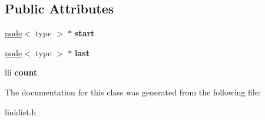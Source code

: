 \subsection*{Public Attributes}
\begin{DoxyCompactItemize}
\item 
\hyperlink{classnode}{node}$<$ type $>$ $\ast$ {\bfseries start}\hypertarget{classlinklist_ae04c2a3c47f24807d639771a0773dd43}{}\label{classlinklist_ae04c2a3c47f24807d639771a0773dd43}

\item 
\hyperlink{classnode}{node}$<$ type $>$ $\ast$ {\bfseries last}\hypertarget{classlinklist_a196ac8c76618fcdad92e8bc9dfb339a4}{}\label{classlinklist_a196ac8c76618fcdad92e8bc9dfb339a4}

\item 
lli {\bfseries count}\hypertarget{classlinklist_ab3fe5146becb2b6c8f874cf9b3f75eb5}{}\label{classlinklist_ab3fe5146becb2b6c8f874cf9b3f75eb5}

\end{DoxyCompactItemize}


The documentation for this class was generated from the following file\+:\begin{DoxyCompactItemize}
\item 
linklist.\+h\end{DoxyCompactItemize}
